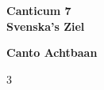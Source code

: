 \clearpage
\vspace*{\fill}
\begin{center}
\Huge \textbf{Canticum 7} \\
\vspace{0.5em}
\Huge \textbf{Svenska’s Ziel}

\end{center}
\vspace*{\fill}
\clearpage

\clearpage
\begin{center}
\Large \textbf{Canto Achtbaan} \\
\vspace{0.5em}
\normalsize 
\end{center}

\vspace{1em}
\begin{multicols}{3}
\raggedright
{}
\end{multicols}

